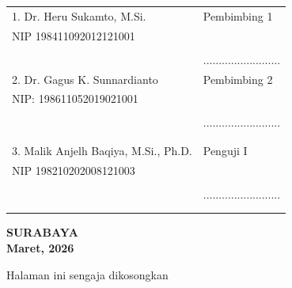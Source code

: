 \begin{center}
\noindent
\begin{tabularx}{\textwidth}{X l}
	1. Dr. Heru Sukamto, M.Si.     & Pembimbing 1 \\
	NIP 198411092012121001       &  \\
	&  \\
	&.........................  \\
	2. Dr. Gagus K. Sunnardianto   & Pembimbing 2\\
	NIP: 198611052019021001 	& \\
	&  \\
	& ......................... \\
	&  \\
	&  \\
	3. Malik Anjelh Baqiya, M.Si., Ph.D.   & Penguji I \\
	NIP 198210202008121003     & \\
        &  \\
	& ......................... \\
        &  \\
	&  \\
\end{tabularx}
\endgroup
  \begin{center}
	\textbf{SURABAYA\\Maret, 2026}
\end{center}
\end{center}

\newpage
\thispagestyle{empty}
\vspace*{\fill}
    \begin{center}
	Halaman ini sengaja dikosongkan
    \end{center}
\vspace*{\fill}
\pagebreak
